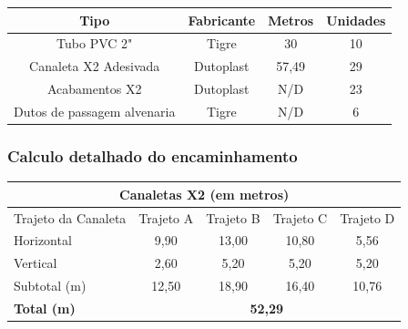 \documentclass[	DIV=calc,%
							paper=a4,%
							fontsize=12pt,%
							onecolumn]{scrartcl}	 					%
\begin{document}


\begin{center}

	\renewcommand{\arraystretch}{1.5}
	\begin{tabular}{|c|c|c|c|}
		\hline
		\textbf{Tipo}       & \textbf{Fabricante} & \multicolumn{1}{l|}{\textbf{Metros}} & \multicolumn{1}{l|}{\textbf{Unidades}} \\ \hline
		Tubo PVC 2"         & Tigre               & 30                                   & 10                                     \\ \hline
		Canaleta X2 Adesivada         & Dutoplast             & 57,49                                  & 29                                     \\ \hline
		Acabamentos X2 & Dutoplast             & N/D                                  & 23                                     \\ \hline
			Dutos de passagem alvenaria & Tigre             & N/D                                  & 6                                     \\ \hline
	\end{tabular}
    	
\end{center}

\subsubsection{Calculo detalhado do encaminhamento}
\vspace{14pt}

\begin{center}
	\renewcommand{\arraystretch}{1.5}
\begin{tabular}{|l|c|c|c|c|}
	\hline
	\multicolumn{5}{|c|}{\textbf{Canaletas X2 (em metros)}}                                                                                                 \\ \hline
	Trajeto da Canaleta & \multicolumn{1}{l|}{Trajeto A} & \multicolumn{1}{l|}{Trajeto B} & \multicolumn{1}{l|}{Trajeto C} & \multicolumn{1}{l|}{Trajeto D} \\ \hline
	Horizontal          & 9,90                           & 13,00                          & 10,80                          & 5,56                           \\ \hline
	Vertical            & 2,60                           & 5,20                           & 5,20                           & 5,20                           \\ \hline
	Subtotal (m)        & 12,50                          & 18,90                          & 16,40                          & 10,76                          \\ \hline
	\textbf{Total (m)}  & \multicolumn{4}{c|}{\textbf{52,29}}                                                                                               \\ \hline
\end{tabular}
\end{center}
\vspace{14pt}
\end{document}
